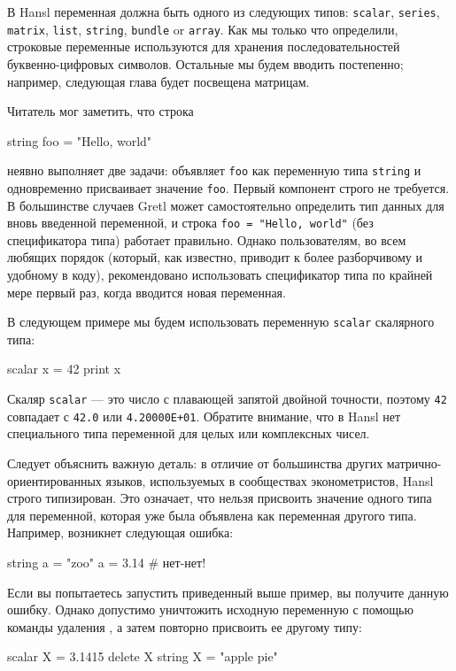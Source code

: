 В Hansl переменная должна быть одного из следующих типов:
\texttt{scalar}, \texttt{series}, \texttt{matrix}, \texttt{list},
\texttt{string}, \texttt{bundle} or \texttt{array}. Как мы только что
определили, строковые переменные используются для хранения
последовательностей буквенно-цифровых символов. Остальные мы будем
вводить постепенно; например, следующая глава будет посвещена
матрицам.

Читатель мог заметить, что строка 
\begin{code}
  string foo = "Hello, world"
\end{code}
неявно выполняет две задачи: объявляет \texttt{foo} как переменную
типа \texttt{string} и одновременно присваивает значение
\texttt{foo}. Первый компонент строго не требуется. В большинстве
случаев Gretl может самостоятельно определить тип данных для вновь
введенной переменной, и строка \verb|foo = "Hello, world"| (без
спецификатора типа) работает правильно.  Однако пользователям, во всем
любящих порядок (который, как известно, приводит к более разборчивому
и удобному в коду), рекомендовано использовать спецификатор типа по
крайней мере первый раз, когда вводится новая переменная.
  
В следующем примере мы будем использовать переменную \texttt{scalar}
скалярного типа:
\begin{code}
  scalar x = 42
  print x
\end{code}
Скаляр \texttt{scalar} --- это число с плавающей запятой двойной
точности, поэтому \texttt{42} совпадает с \texttt{42.0} или
\texttt{4.20000E+01}. Обратите внимание, что в Hansl нет специального
типа переменной для целых или комплексных чисел.

Следует объяснить важную деталь: в отличие от большинства других
матрично-ориентированных языков, используемых в сообществах
эконометристов, Hansl строго типизирован. Это означает, что нельзя
присвоить значение одного типа для переменной, которая уже была
объявлена как переменная другого типа. Например, возникнет следующая
ошибка:
\begin{code}
  string a = "zoo"
  a = 3.14 # нет-нет!
\end{code}
Если вы попытаетесь запустить приведенный выше пример, вы получите
данную ошибку. Однако допустимо уничтожить исходную переменную с
помощью команды удаления , а затем повторно присвоить ее
другому типу:
\begin{code}
  scalar X = 3.1415
  delete X
  string X = "apple pie"
\end{code}

